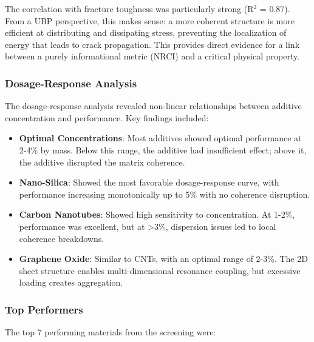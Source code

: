 \documentclass[11pt,a4paper]{article}
\begin{document}
The correlation with fracture toughness was particularly strong (R$^2$ = 0.87). From a UBP perspective, this makes sense: a more coherent structure is more efficient at distributing and dissipating stress, preventing the localization of energy that leads to crack propagation. This provides direct evidence for a link between a purely informational metric (NRCI) and a critical physical property.

\subsubsection{Dosage-Response Analysis}

The dosage-response analysis revealed non-linear relationships between additive concentration and performance. Key findings included:

\begin{itemize}
    \item \textbf{Optimal Concentrations}: Most additives showed optimal performance at 2-4\% by mass. Below this range, the additive had insufficient effect; above it, the additive disrupted the matrix coherence.
    
    \item \textbf{Nano-Silica}: Showed the most favorable dosage-response curve, with performance increasing monotonically up to 5\% with no coherence disruption.
    
    \item \textbf{Carbon Nanotubes}: Showed high sensitivity to concentration. At 1-2\%, performance was excellent, but at >3\%, dispersion issues led to local coherence breakdowns.
    
    \item \textbf{Graphene Oxide}: Similar to CNTs, with an optimal range of 2-3\%. The 2D sheet structure enables multi-dimensional resonance coupling, but excessive loading creates aggregation.
\end{itemize}

\subsubsection{Top Performers}

The top 7 performing materials from the screening were:
\end{document}
